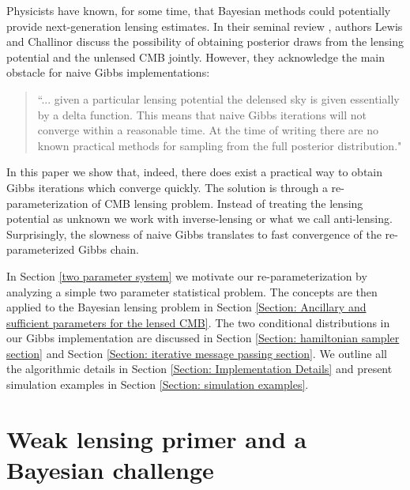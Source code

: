 \documentclass[noinfoline]{imsart}
\begin{document}
Physicists have known, for some time, that Bayesian methods could potentially provide next-generation lensing estimates. In their seminal review \cite{Lewis20061}, authors Lewis and Challinor  discuss the possibility of obtaining posterior draws from the lensing potential and the unlensed CMB jointly. However, they acknowledge the main obstacle for naive Gibbs implementations:
\begin{quote}
``... given a particular lensing potential the delensed sky is given essentially by a delta function.
This means that naive Gibbs iterations will not converge within a reasonable time. At the time of writing there are no known practical methods for sampling from the full posterior distribution."
\end{quote}
In this paper we show that, indeed, there does exist a practical way to obtain Gibbs iterations which converge quickly. The solution is through a re-parameterization of CMB lensing problem. Instead of treating the lensing potential as unknown we work with inverse-lensing or what we call anti-lensing. Surprisingly, the slowness of naive Gibbs translates to fast convergence of the re-parameterized Gibbs chain. 



In Section \ref{two parameter system} we motivate our re-parameterization by analyzing a simple two parameter statistical problem.  The concepts are then applied to the Bayesian lensing problem in Section \ref{Section: Ancillary and sufficient parameters for the lensed CMB}. The two conditional distributions in our Gibbs implementation are discussed in Section \ref{Section: hamiltonian sampler section} and Section \ref{Section: iterative message passing section}. We outline all the algorithmic details in Section \ref{Section: Implementation Details} and present simulation examples in Section \ref{Section: simulation examples}.




%
%
\section{Weak lensing primer and a Bayesian challenge}
\label{primer}
\end{document}
